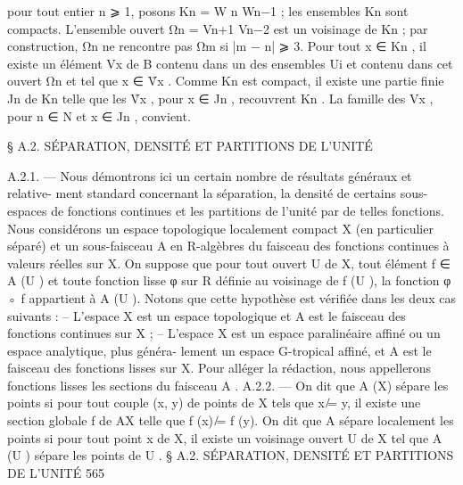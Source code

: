 \documentclass[
  10pt,
]{article}
\newenvironment{Shaded}{}{}
\newcommand{\NormalTok}[1]{#1}
\begin{document}
\begin{Shaded}
\begin{Highlighting}[]
\NormalTok{pour tout entier n ⩾ 1, posons Kn = W n Wn−1 ; les ensembles Kn sont compacts.}
\NormalTok{L’ensemble ouvert Ωn = Vn+1 Vn−2 est un voisinage de Kn ; par construction, Ωn ne}
\NormalTok{rencontre pas Ωm si |m − n| ⩾ 3. Pour tout x ∈ Kn , il existe un élément Vx de B contenu}
\NormalTok{dans un des ensembles Ui et contenu dans cet ouvert Ωn et tel que x ∈ V̊x . Comme Kn est}
\NormalTok{compact, il existe une partie finie Jn de Kn telle que les V̊x , pour x ∈ Jn , recouvrent Kn .}
\NormalTok{La famille des Vx , pour n ∈ N et x ∈ Jn , convient.}




\NormalTok{      § A.2. SÉPARATION, DENSITÉ ET PARTITIONS DE L’UNITÉ}

\NormalTok{A.2.1. — Nous démontrons ici un certain nombre de résultats généraux et relative{-}}
\NormalTok{ment standard concernant la séparation, la densité de certains sous{-}espaces de fonctions}
\NormalTok{continues et les partitions de l’unité par de telles fonctions.}
\NormalTok{   Nous considérons un espace topologique localement compact X (en particulier séparé)}
\NormalTok{et un sous{-}faisceau A en R{-}algèbres du faisceau des fonctions continues à valeurs réelles}
\NormalTok{sur X. On suppose que pour tout ouvert U de X, tout élément f ∈ A (U ) et toute}
\NormalTok{fonction lisse φ sur R définie au voisinage de f (U ), la fonction φ ◦ f appartient à A (U ).}
\NormalTok{   Notons que cette hypothèse est vérifiée dans les deux cas suivants :}
\NormalTok{   – L’espace X est un espace topologique et A est le faisceau des fonctions continues}
\NormalTok{sur X ;}
\NormalTok{   – L’espace X est un espace paralinéaire affiné ou un espace analytique, plus généra{-}}
\NormalTok{lement un espace G{-}tropical affiné, et A est le faisceau des fonctions lisses sur X.}
\NormalTok{   Pour alléger la rédaction, nous appellerons fonctions lisses les sections du faisceau A .}
\NormalTok{A.2.2. — On dit que A (X) sépare les points si pour tout couple (x, y) de points de X}
\NormalTok{tels que x ̸= y, il existe une section globale f de AX telle que f (x) ̸= f (y).}
\NormalTok{   On dit que A sépare localement les points si pour tout point x de X, il existe un}
\NormalTok{voisinage ouvert U de X tel que A (U ) sépare les points de U .}
\NormalTok{                   § A.2. SÉPARATION, DENSITÉ ET PARTITIONS DE L’UNITÉ                      565}


\end{Highlighting}
\end{Shaded}
\end{document}
